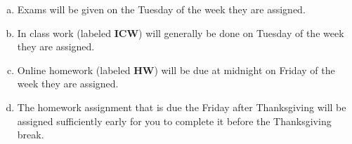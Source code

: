 \documentclass[12pt]{article}
\newcounter{ex}\setcounter{ex}{0}
\newenvironment{alphalist}{
  \begin{enumerate}[(a)]
    \addtolength{\itemsep}{-0.5\itemsep}}
  {\end{enumerate}}
\begin{document}
\begin{alphalist}
   \item Exams will be given on the Tuesday of the week they are assigned.
   
   \item In class work (labeled \textbf{ICW}) will generally be 
    done on Tuesday of the week they are assigned.

    \item Online homework (labeled \textbf{HW}) will be due at midnight on
          Friday of the week they are assigned. 

    \item The homework assignment that is due the Friday after Thanksgiving
          will be assigned sufficiently early for you to complete it before
          the Thanksgiving break.
\end{alphalist}

\vspace{0.1in}
\end{document}
